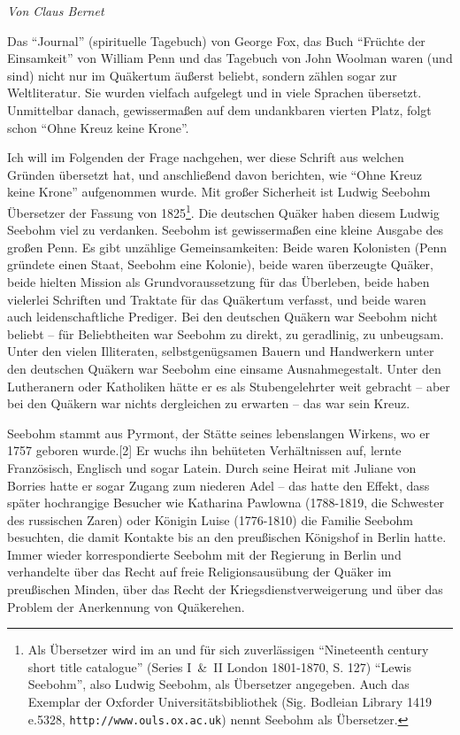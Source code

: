 
\begin{flushright}
\begin{footnotesize}
\textit{Von Claus Bernet}
\end{footnotesize}
\end{flushright}
\smallskip

Das "`Journal"' (spirituelle Tagebuch) von George Fox, das Buch "`Früchte der
Einsamkeit"' von William Penn und das Tagebuch von John Woolman waren (und sind)
nicht nur im Quäkertum äußerst beliebt, sondern zählen sogar zur Weltliteratur.
Sie wurden vielfach aufgelegt und in viele Sprachen übersetzt. Unmittelbar
danach, gewissermaßen auf dem undankbaren vierten Platz, folgt schon "`Ohne
Kreuz keine Krone"'.

\medskip

Ich will im Folgenden der Frage nachgehen, wer diese Schrift aus welchen Gründen
übersetzt hat, und anschließend davon berichten, wie "`Ohne Kreuz keine Krone"'
aufgenommen wurde. Mit großer Sicherheit ist Ludwig Seebohm Übersetzer der
Fassung von 1825\footnote{Als Übersetzer wird im an und für sich zuverlässigen "`Nineteenth century
short title catalogue"' (Series I~\&~II London 1801-1870, S. 127) "`Lewis
Seebohm"', also Ludwig Seebohm, als Übersetzer angegeben. Auch das Exemplar der
Oxforder Universitätsbibliothek (Sig. Bodleian Library 1419 e.5328,
\texttt{http://www.ouls.ox.ac.uk}) nennt Seebohm als Übersetzer.}.%
Die deutschen Quäker haben diesem Ludwig Seebohm viel zu
verdanken. Seebohm ist gewissermaßen eine kleine Ausgabe des großen Penn. Es
gibt unzählige Gemeinsamkeiten: Beide waren Kolonisten (Penn gründete einen
Staat, Seebohm eine Kolonie), beide waren überzeugte Quäker, beide hielten
Mission als Grundvoraussetzung für das Überleben, beide haben vielerlei
Schriften und Traktate für das Quäkertum verfasst, und beide waren auch
leidenschaftliche Prediger.
Bei den deutschen Quäkern war Seebohm nicht beliebt – für Beliebtheiten war
Seebohm zu direkt, zu geradlinig, zu unbeugsam. Unter den vielen Illiteraten,
selbstgenügsamen Bauern und Handwerkern unter den deutschen Quäkern war Seebohm
eine einsame Ausnahmegestalt. Unter den Lutheranern oder Katholiken hätte er es
als Stubengelehrter weit gebracht – aber bei den Quäkern war nichts dergleichen
zu erwarten – das war sein Kreuz.

\medskip

Seebohm stammt aus Pyrmont, der Stätte seines lebenslangen Wirkens, wo er 1757
geboren wurde.[2] Er wuchs ihn behüteten Verhältnissen auf, lernte Französisch,
Englisch und sogar Latein. Durch seine Heirat mit Juliane von Borries hatte er
sogar Zugang zum niederen Adel – das hatte den Effekt, dass später hochrangige
Besucher wie Katharina Pawlowna (1788-1819, die Schwester des russischen Zaren)
oder Königin Luise (1776-1810) die Familie Seebohm besuchten, die damit Kontakte
bis an den preußischen Königshof in Berlin hatte. Immer wieder korrespondierte
Seebohm mit der Regierung in Berlin und verhandelte über das Recht auf freie
Religionsausübung der Quäker im preußischen Minden, über das Recht der
Kriegsdienstverweigerung und über das Problem der Anerkennung von Quäkerehen.

